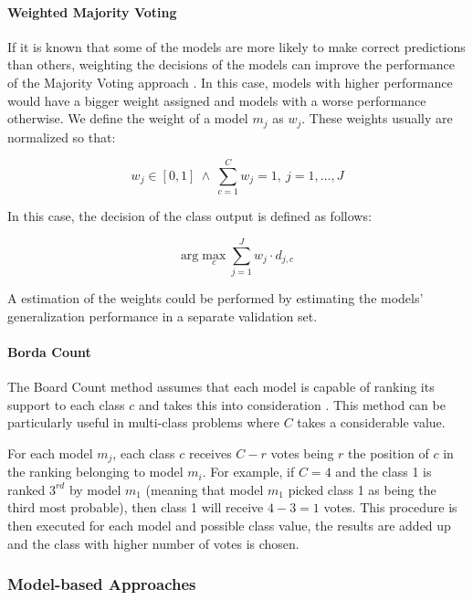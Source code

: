 \paragraph{Weighted Majority Voting}\mbox{}

If it is known that some of the models are more likely to make correct predictions than others, weighting the decisions of the models can improve the performance of the Majority Voting approach \cite{Polikar2012a}.
In this case, models with higher performance would have a bigger weight assigned and models with a worse performance otherwise.
We define the weight of a model $m_j$ as $w_j$.
These weights usually are normalized so that:

\begin{equation}
w_j \in [0, 1] \ \wedge \ \sum_{c = 1}^{C} w_{j} = 1, \ j = 1, \dots, J
\end{equation}

In this case, the decision of the class output is defined as follows:

\begin{equation}
\text{arg}\max_c \sum_{j = 1}^{J} w_j \cdot d_{j,c}
\end{equation}

A estimation of the weights could be performed by estimating the models' generalization performance in a separate validation set.

\paragraph{Borda Count}\mbox{}

The Board Count method assumes that each model is capable of ranking its support to each class $c$ and takes this into consideration \cite{Polikar2012a}. This method can be particularly useful in multi-class problems where $C$ takes a considerable value.

For each model $m_j$, each class $c$ receives $C-r$ votes being $r$ the position of $c$ in the ranking belonging to model $m_i$.
For example, if $C = 4$ and the class 1 is ranked $3^{rd}$ by model $m_1$ (meaning that model $m_1$ picked class 1 as being the third most probable), then class 1 will receive $4-3 = 1$ votes.
This procedure is then executed for each model and possible class value, the results are added up and the class with higher number of votes is chosen.

\subsubsection{Model-based Approaches}

